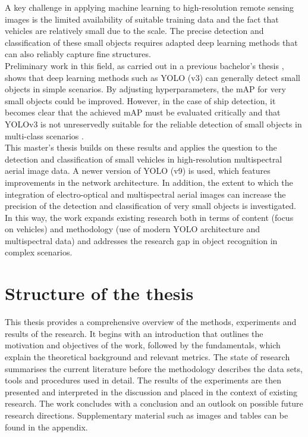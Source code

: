 A key challenge in applying machine learning to high-resolution remote sensing images is the limited availability of suitable training data and the fact that vehicles are relatively small due to the scale. The precise detection and classification of these small objects requires adapted deep learning methods that can also reliably capture fine structures. \\

Preliminary work in this field, as carried out in a previous bachelor's thesis \cite{Balzer2022}, shows that deep learning methods such as \acrfull{YOLO} (v3) can generally detect small objects in simple scenarios. By adjusting hyperparameters, the \acrfull{mAP} for very small objects could be improved. However, in the case of ship detection, it becomes clear that the achieved mAP must be evaluated critically and that YOLOv3 is not unreservedly suitable for the reliable detection of small objects in multi-class scenarios \cite{Balzer2022}. \\

This master's thesis builds on these results and applies the question to the detection and classification of small vehicles in high-resolution multispectral aerial image data. A newer version of \acrshort{YOLO} (v9) is used, which features improvements in the network architecture. In addition, the extent to which the integration of electro-optical and multispectral aerial images can increase the precision of the detection and classification of very small objects is investigated. In this way, the work expands existing research both in terms of content (focus on vehicles) and methodology (use of modern YOLO architecture and multispectral data) and addresses the research gap in object recognition in complex scenarios.



\section{Structure of the thesis}


This thesis provides a comprehensive overview of the methods, experiments and results of the research. It begins with an introduction that outlines the motivation and objectives of the work, followed by the fundamentals, which explain the theoretical background and relevant metrics. The state of research summarises the current literature before the methodology describes the data sets, tools and procedures used in detail. The results of the experiments are then presented and interpreted in the discussion and placed in the context of existing research. The work concludes with a conclusion and an outlook on possible future research directions. Supplementary material such as images and tables can be found in the appendix.
